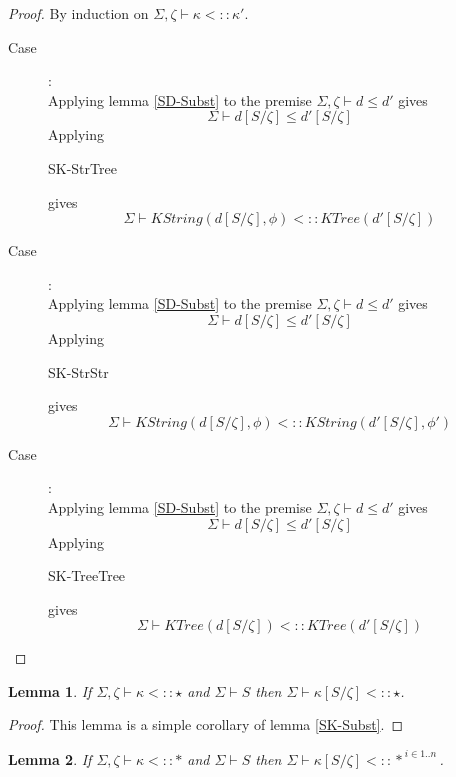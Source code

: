 \documentclass{article}
\newtheorem{lemma}{Lemma}
\begin{document}
\begin{proof}
By induction on $\Sigma,\zeta \vdash \kappa <:: \kappa'$.

\begin{description}
\item[Case \begin{sc}SK-StrTree\end{sc}]:~\\
Applying lemma \ref{SD-Subst} to the premise $\Sigma,\zeta \vdash d \leq d'$ gives $$\Sigma \vdash d[S/\zeta] \leq d'[S/\zeta]$$ Applying \begin{sc}SK-StrTree\end{sc} gives $$\Sigma \vdash \mathit{KString(d[S/\zeta],\phi) <:: \mathit{KTree}(d'[S/\zeta])}$$
\item[Case \begin{sc}SK-StrStr\end{sc}]:~\\
Applying lemma \ref{SD-Subst} to the premise $\Sigma,\zeta \vdash d \leq d'$ gives $$\Sigma \vdash d[S/\zeta] \leq d'[S/\zeta]$$ Applying \begin{sc}SK-StrStr\end{sc} gives $$\Sigma \vdash \mathit{KString}(d[S/\zeta],\phi) <:: \mathit{KString}(d'[S/\zeta], \phi')$$
\item[Case \begin{sc}SK-TreeTree\end{sc}]:~\\
Applying lemma \ref{SD-Subst} to the premise $\Sigma,\zeta \vdash d \leq d'$ gives $$\Sigma \vdash d[S/\zeta] \leq d'[S/\zeta]$$ Applying \begin{sc}SK-TreeTree\end{sc} gives $$\Sigma \vdash \mathit{KTree}(d[S/\zeta]) <:: \mathit{KTree}(d'[S/\zeta])$$
\end{description}
\end{proof}

\begin{lemma}
If $\Sigma,\zeta \vdash \kappa <:: \star$ and $\Sigma \vdash S$ then
$\Sigma \vdash \kappa[S/\zeta] <:: \star$.
\label{SK-Subst2}
\end{lemma}

\begin{proof}
This lemma is a simple corollary of lemma \ref{SK-Subst}.
\end{proof}


\begin{lemma}
If $\Sigma,\zeta \vdash \kappa <:: \ast$ and $\Sigma \vdash S$ then
$\Sigma \vdash \kappa[S/\zeta] <:: \ast^{~i \in 1..n}$.
\label{SK-Subst3}
\end{lemma}
\end{document}
